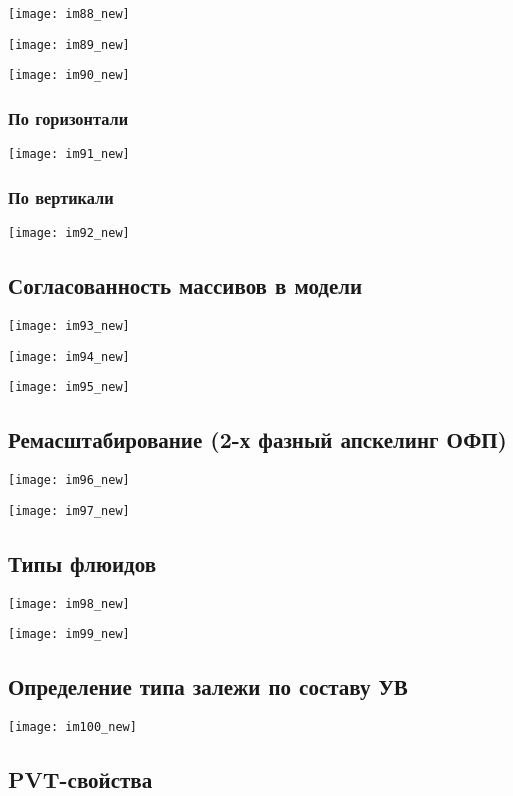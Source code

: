 \documentclass[main.tex]{subfiles}
\begin{document}
\texttt{[image: im88\_new]}

\texttt{[image: im89\_new]}

\texttt{[image: im90\_new]}

\subsubsection{По горизонтали}

\texttt{[image: im91\_new]}

\subsubsection{По вертикали}

\texttt{[image: im92\_new]}

\subsection{Согласованность массивов в модели}

\texttt{[image: im93\_new]}

\texttt{[image: im94\_new]}

\texttt{[image: im95\_new]}

\subsection{Ремасштабирование (2-х фазный апскелинг ОФП)}

\texttt{[image: im96\_new]}

\texttt{[image: im97\_new]}

\subsection{Типы флюидов}

\texttt{[image: im98\_new]}

\texttt{[image: im99\_new]}

\subsection{Определение типа залежи по составу УВ}

\texttt{[image: im100\_new]}

\subsection{PVT-свойства}
\end{document}
